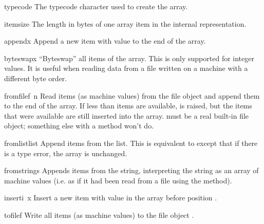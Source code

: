 \begin{datadesc}{typecode}
The typecode character used to create the array.
\end{datadesc}

\begin{datadesc}{itemsize}
The length in bytes of one array item in the internal representation.
\end{datadesc}

\begin{funcdesc}{append}{x}
Append a new item with value  to the end of the array.
\end{funcdesc}

\begin{funcdesc}{byteswap}{x}
``Byteswap'' all items of the array.  This is only supported for
integer values.  It is useful when reading data from a file written
on a machine with a different byte order.
\end{funcdesc}

\begin{funcdesc}{fromfile}{f\, n}
Read  items (as machine values) from the file object 
and append them to the end of the array.  If less than  items
are available,  is raised, but the items that were
available are still inserted into the array.   must be a real
built-in file object; something else with a  method won't
do.
\end{funcdesc}

\begin{funcdesc}{fromlist}{list}
Append items from the list.  This is equivalent to
except that if there is a type error, the array is unchanged.
\end{funcdesc}

\begin{funcdesc}{fromstring}{s}
Appends items from the string, interpreting the string as an
array of machine values (i.e. as if it had been read from a
file using the  method).
\end{funcdesc}

\begin{funcdesc}{insert}{i\, x}
Insert a new item with value  in the array before position
.
\end{funcdesc}

\begin{funcdesc}{tofile}{f}
Write all items (as machine values) to the file object .
\end{funcdesc}


